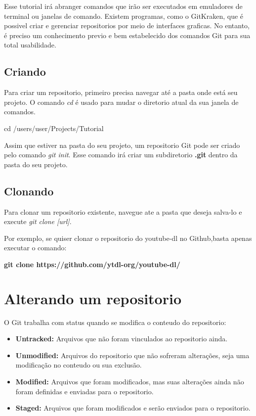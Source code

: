 \documentclass[]{article}
\begin{document}
Esse tutorial irá abranger comandos que irão ser executados em emuladores de terminal ou janelas de comando. 
Existem programas, como o GitKraken, que é possivel criar e gerenciar repositorios por meio de interfaces graficas. No entanto, é preciso
um conhecimento previo e bem estabelecido dos comandos Git para sua total usabilidade.

\subsection*{Criando}

Para criar um repositorio, primeiro precisa navegar até a pasta onde está seu projeto. O comando \textit{cd} é usado para mudar o diretorio atual da sua janela de comandos.

cd /users/user/Projects/Tutorial

Assim que estiver na pasta do seu projeto, um repositorio Git pode ser criado pelo comando \textit{git init}. Esse comando irá criar um subdiretorio \textbf{ .git } dentro da pasta do seu projeto.

\subsection*{Clonando}

Para clonar um repositorio existente, navegue ate a pasta que deseja salva-lo e execute \textit{git clone [url]}.

Por exemplo, se quiser clonar o repositorio do youtube-dl no Github,basta apenas executar o comando: 

\textbf{git clone https://github.com/ytdl-org/youtube-dl/}

\section{Alterando um repositorio}

O Git trabalha com status quando se modifica o conteudo do repositorio:

\begin{itemize}
    \item {\textbf{Untracked: }} Arquivos que não foram vinculados ao repositorio ainda.
    \item {\textbf{Unmodified: }} Arquivos do repositorio que não sofreram alterações, seja uma modificação no conteudo ou sua exclusão.
    \item {\textbf{Modified: }} Arquivos que foram modificados, mas suas alterações ainda não foram definidas e enviadas para o repositorio.
    \item {\textbf{Staged: }} Arquivos que foram modificados e serão enviados para o repositorio.
\end{itemize}
\end{document}
